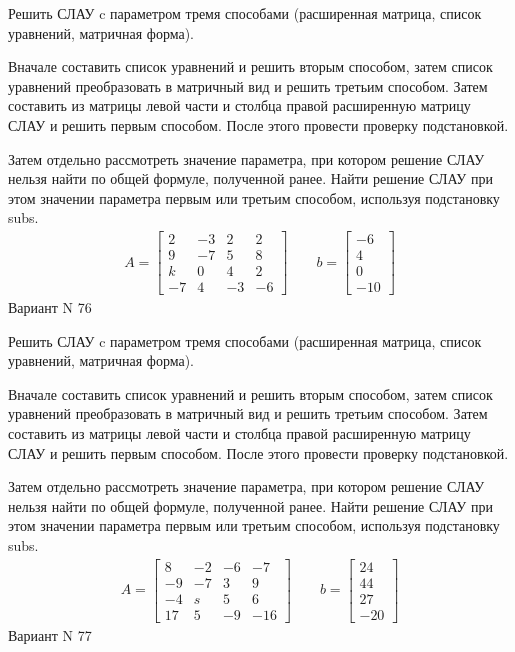 \documentclass[11pt]{report}
\begin{document}
Решить СЛАУ c параметром тремя способами (расширенная матрица, список уравнений, матричная форма).

Вначале составить список уравнений и решить вторым способом,
затем список уравнений преобразовать в матричный вид и решить третьим способом.
Затем составить из матрицы левой части и столбца правой расширенную матрицу СЛАУ и решить первым способом.
После этого провести проверку подстановкой.

Затем отдельно рассмотреть значение параметра, при котором решение СЛАУ нельзя найти по общей формуле,
полученной ранее.
Найти решение СЛАУ при этом значении параметра первым или третьим способом, используя подстановку subs.
\begin{align*}
    A = \left[\begin{matrix}2 & -3 & 2 & 2\\9 & -7 & 5 & 8\\k & 0 & 4 & 2\\-7 & 4 & -3 & -6\end{matrix}\right]
\qquad b = \left[\begin{matrix}-6\\4\\0\\-10\end{matrix}\right]
\end{align*}
\newpage
Вариант N 76


Решить СЛАУ c параметром тремя способами (расширенная матрица, список уравнений, матричная форма).

Вначале составить список уравнений и решить вторым способом,
затем список уравнений преобразовать в матричный вид и решить третьим способом.
Затем составить из матрицы левой части и столбца правой расширенную матрицу СЛАУ и решить первым способом.
После этого провести проверку подстановкой.

Затем отдельно рассмотреть значение параметра, при котором решение СЛАУ нельзя найти по общей формуле,
полученной ранее.
Найти решение СЛАУ при этом значении параметра первым или третьим способом, используя подстановку subs.
\begin{align*}
    A = \left[\begin{matrix}8 & -2 & -6 & -7\\-9 & -7 & 3 & 9\\-4 & s & 5 & 6\\17 & 5 & -9 & -16\end{matrix}\right]
\qquad b = \left[\begin{matrix}24\\44\\27\\-20\end{matrix}\right]
\end{align*}
\newpage
Вариант N 77
\end{document}

